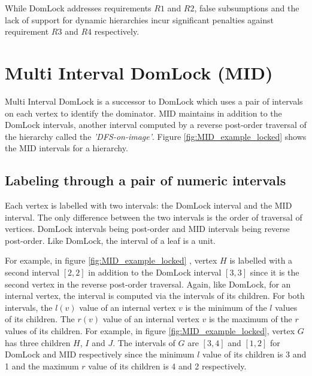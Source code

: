 While DomLock addresses requirements $R1$ and $R2$, false subsumptions and the lack of support for dynamic hierarchies incur significant penalties against requirement $R3$ and $R4$ respectively.



\section{Multi Interval DomLock (MID)}
Multi Interval DomLock \cite{anjuMID} is a successor to DomLock which uses a pair of intervals on each vertex to identify the dominator. MID maintains in addition to the DomLock intervals, another interval computed by a reverse post-order traversal of the hierarchy called the \emph{'DFS-on-image'}. Figure \ref{fig:MID_example_locked} shows the MID intervals for a hierarchy. 

\subsection{Labeling through a pair of numeric intervals}

Each vertex is labelled with two intervals: the DomLock interval and the MID interval. The only difference between the two intervals is the order of traversal of vertices. DomLock intervals being post-order and MID intervals being reverse post-order. Like DomLock, the interval of a leaf is a unit.

For example, in figure \ref{fig:MID_example_locked} , vertex $H$ is labelled with a second interval $[2,2]$ in addition to the DomLock interval $[3,3]$ since it is the second vertex in the reverse post-order traversal. Again, like DomLock, for an internal vertex, the interval is computed via the intervals of its children. For both intervals, the $l(v)$ value of an internal vertex $v$ is the minimum of the $l$ values of its children. The $r(v)$ value of an internal vertex $v$ is the maximum of the $r$ values of its children. For example, in figure \ref{fig:MID_example_locked}, vertex $G$ has three children $H$, $I$ and $J$. The intervals of $G$ are $[3,4]$ and $[1,2]$ for DomLock and MID respectively since the minimum $l$ value of its children is 3 and 1 and the maximum $r$ value of its children is 4 and 2 respectively.


